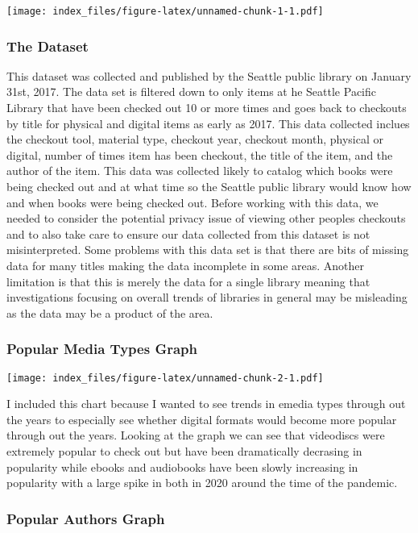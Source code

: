 \documentclass[
]{article}
\begin{document}
\texttt{[image: index\_files/figure-latex/unnamed-chunk-1-1.pdf]}

\hypertarget{the-dataset}{%
\subsubsection{The Dataset}\label{the-dataset}}

This dataset was collected and published by the Seattle public library
on January 31st, 2017. The data set is filtered down to only items at he
Seattle Pacific Library that have been checked out 10 or more times and
goes back to checkouts by title for physical and digital items as early
as 2017. This data collected inclues the checkout tool, material type,
checkout year, checkout month, physical or digital, number of times item
has been checkout, the title of the item, and the author of the item.
This data was collected likely to catalog which books were being checked
out and at what time so the Seattle public library would know how and
when books were being checked out. Before working with this data, we
needed to consider the potential privacy issue of viewing other peoples
checkouts and to also take care to ensure our data collected from this
dataset is not misinterpreted. Some problems with this data set is that
there are bits of missing data for many titles making the data
incomplete in some areas. Another limitation is that this is merely the
data for a single library meaning that investigations focusing on
overall trends of libraries in general may be misleading as the data may
be a product of the area.

\hypertarget{popular-media-types-graph}{%
\subsubsection{Popular Media Types
Graph}\label{popular-media-types-graph}}

\texttt{[image: index\_files/figure-latex/unnamed-chunk-2-1.pdf]}

I included this chart because I wanted to see trends in emedia types
through out the years to especially see whether digital formats would
become more popular through out the years. Looking at the graph we can
see that videodiscs were extremely popular to check out but have been
dramatically decrasing in popularity while ebooks and audiobooks have
been slowly increasing in popularity with a large spike in both in 2020
around the time of the pandemic.

\hypertarget{popular-authors-graph}{%
\subsubsection{Popular Authors Graph}\label{popular-authors-graph}}
\end{document}
